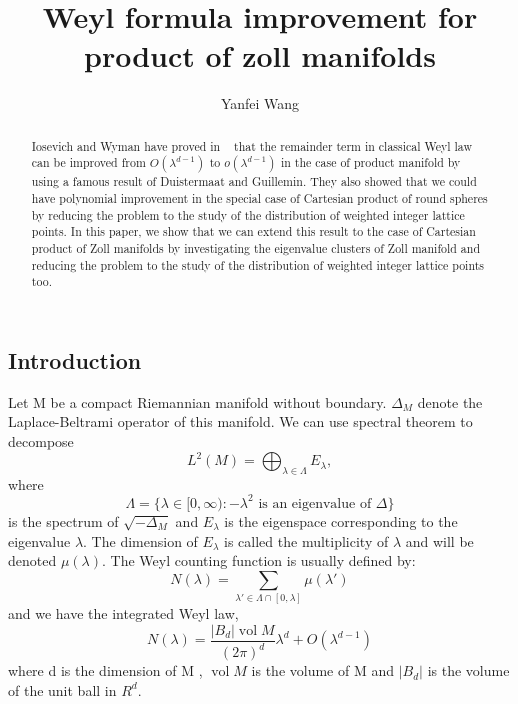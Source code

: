 \documentclass[10pt]{amsart}
\newcommand{\newsection}[1]
{\subsection{#1}\setcounter{theorem}{0} \setcounter{equation}{0}
\par\noindent}
\newcommand{\1}{\mathbb{1}}
\newcommand{\vol}{\operatorname{vol}}
\begin{document}
\title[Improved Estimates on Product Manifolds]
{Weyl formula improvement for product of zoll manifolds}
%
%
%

\author[]{Yanfei Wang}
\address[Y.F.W.]{Department of Mathematics,  Johns Hopkins University,
Baltimore, MD 21218}


\begin{abstract}
Iosevich and Wyman have proved in ~\cite{IoWy} that the remainder term in classical Weyl law can be improved from $O(\lambda^{d-1})$ to $o(\lambda^{d-1})$ in the case of product manifold by using a famous result of Duistermaat and Guillemin. They also showed that we could have polynomial improvement in the special case of Cartesian product of round spheres by reducing the problem to the study of the distribution of weighted integer lattice points. In this paper, we show that we can extend this result to the case of Cartesian product of Zoll manifolds by investigating the eigenvalue clusters of Zoll manifold and reducing the problem to the study of the distribution of weighted integer lattice points too.
\end{abstract}


\maketitle




\newsection{Introduction}


Let M be a compact Riemannian manifold without boundary. $\Delta_M$ denote the Laplace-Beltrami operator of this manifold. We can use spectral theorem to decompose 
\[
    L^2(M) =  \bigoplus_{\lambda \in \Lambda} E_\lambda ,
\]
where
\[
    \Lambda = \{\lambda \in [0,\infty) : -\lambda^2 \text{ is an eigenvalue of $\Delta$}\}
\]
is the spectrum of $\sqrt{-\Delta_M}$ and $E_{\lambda}$ is the eigenspace corresponding to the eigenvalue $\lambda$. The dimension of $E_{\lambda}$ is called the multiplicity of $\lambda$ and will be denoted $\mu(\lambda)$. The Weyl counting function is usually defined by:
\[
N(\lambda) = \sum_{\lambda'\in \Lambda \cap [0,\lambda]} \mu(\lambda')
\]
and we have the integrated Weyl law,
\begin{equation}\label{the weyl law}
    N(\lambda) = \frac{|B_d| \vol M}{(2\pi)^d} \lambda^{d} + O(\lambda^{d - 1})
\end{equation}
where d is the dimension of M , $\vol M$ is the volume of M and $|B_d|$ is the volume of the unit ball in $R^d$.
\end{document}
